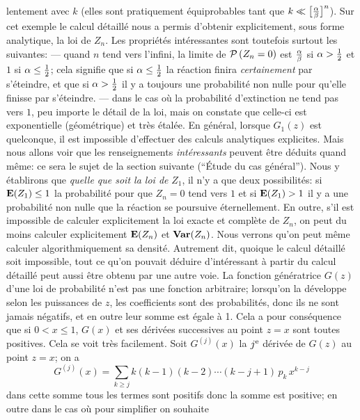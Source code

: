 lentement  avec $k$ (elles sont pratiquement \'equiprobables tant que $k
\ll \bigl[ {\alpha\over\beta}\bigr]^n$).
\bigskip
Sur cet exemple le calcul d\'etaill\'e nous a permis d'obtenir 
explicitement, sous forme analytique, la loi de $Z_n$. Les propri\'et\'es
int\'eressantes sont toutefois surtout les suivantes:
\smallskip
--- quand $n$ tend vers l'infini, la limite de ${\cal P}\, (Z_n = 0)$ est
$\alpha\over\beta$ si $\alpha > {1\over 2}$ et  $1$ si $\alpha \leq
{1\over 2}$; cela signifie que si $\alpha \leq {1\over 2}$ la r\'eaction
finira {\it certainement} par s'\'eteindre, et que si $\alpha > {1\over
2}$ il y a toujours une probabilit\'e non nulle pour qu'elle finisse par
s'\'eteindre.
\smallskip
--- dans le cas o\`u la probabilit\'e d'extinction ne tend pas vers $1$, 
peu importe le d\'etail de la loi, mais on constate que celle-ci est
exponentielle (g\'eom\'etrique) et tr\`es \'etal\'ee.
\medskip
En g\'en\'eral, lorsque $G_1(z)$ est quelconque, il est impossible
d'effectuer des calculs analytiques explicites. Mais nous allons voir que
les renseignements {\it int\'eressants} peuvent \^etre d\'eduits quand
m\^eme: ce sera le sujet de la section suivante (``\'Etude du cas 
g\'en\'eral''). Nous y \'etablirons que {\it quelle que soit la loi de} $Z_1$,
il n'y a que deux possibilit\'es: si ${\bf E}(Z_1) \leq 1$ la probabilit\'e
pour que  $Z_n = 0$ tend vers $1$ et si ${\bf E}(Z_1) > 1$ il y a une
probabilit\'e non nulle  que la r\'eaction se poursuive \'eternellement. En
outre, s'il est impossible de calculer explicitement la loi exacte et
compl\`ete de $Z_n$, on peut du moins calculer explicitement ${\bf
E}(Z_n)$ et ${\bf Var}(Z_n)$. Nous verrons qu'on peut m\^eme calculer
algorithmiquement sa densit\'e. Autrement dit, quoique le calcul
d\'etaill\'e soit impossible, tout ce qu'on pouvait d\'eduire
d'int\'eressant \`a partir du calcul d\'etaill\'e peut aussi \^etre obtenu
par une autre voie. 
\bigskip
La fonction g\'en\'eratrice $G(z)$ d'une loi de probabilit\'e n'est pas 
une fonction arbitraire; lorsqu'on la d\'eveloppe selon les puissances de
$z$, les coefficients sont des probabilit\'es, donc ils ne sont jamais 
n\'egatifs, et en outre leur somme est \'egale \`a 1.  Cela a pour
cons\'equence que si   $0 < x \leq 1$, $G(x)$ et ses d\'eriv\'ees
successives au point $z = x$ sont  toutes positives. Cela se voit tr\`es
facilement. Soit $G^{(j)}(x)$ la $j^{\rm e}$ d\'eriv\'ee de $G(z)$ au point
$z = x$; on a 
$$G^{(j)}(x) = \sum_{k\geq j} k(k-1)(k-2) \cdots (k-j+1)\, p_k\, x^{k-j}$$ 
dans cette somme tous les termes sont positifs donc la somme
est positive; en outre dans le cas o\`u pour simplifier on souhaite
